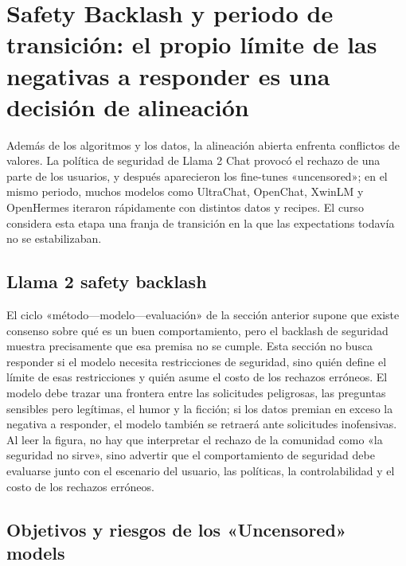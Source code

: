 \section{Safety Backlash y periodo de transición: el propio límite de las negativas a responder es una decisión de alineación}

Además de los algoritmos y los datos, la alineación abierta enfrenta conflictos de valores. La política de seguridad de Llama 2 Chat provocó el rechazo de una parte de los usuarios, y después aparecieron los fine-tunes «uncensored»; en el mismo periodo, muchos modelos como UltraChat, OpenChat, XwinLM y OpenHermes iteraron rápidamente con distintos datos y recipes. El curso considera esta etapa una franja de transición en la que las expectations todavía no se estabilizaban.

\subsection{Llama 2 safety backlash}

El ciclo «método—modelo—evaluación» de la sección anterior supone que existe consenso sobre qué es un buen comportamiento, pero el backlash de seguridad muestra precisamente que esa premisa no se cumple. Esta sección no busca responder si el modelo necesita restricciones de seguridad, sino quién define el límite de esas restricciones y quién asume el costo de los rechazos erróneos. El modelo debe trazar una frontera entre las solicitudes peligrosas, las preguntas sensibles pero legítimas, el humor y la ficción; si los datos premian en exceso la negativa a responder, el modelo también se retraerá ante solicitudes inofensivas. Al leer la figura, no hay que interpretar el rechazo de la comunidad como «la seguridad no sirve», sino advertir que el comportamiento de seguridad debe evaluarse junto con el escenario del usuario, las políticas, la controlabilidad y el costo de los rechazos erróneos.



\subsection{Objetivos y riesgos de los «Uncensored» models}

